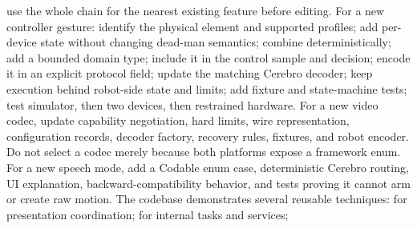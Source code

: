 {}
\markdownRendererSectionEnd \markdownRendererSectionBegin
{}\markdownRendererInterblockSeparator
{}\markdownRendererBlockQuoteBegin
{} use the whole chain for the nearest existing feature before editing.\markdownRendererBlockQuoteEnd \markdownRendererInterblockSeparator
{}For a new controller gesture:\markdownRendererInterblockSeparator
{}\markdownRendererOlBegin
{}identify the physical element and supported profiles;\markdownRendererOlItemEnd 
{}add per-device state without changing dead-man semantics;\markdownRendererOlItemEnd 
{}combine deterministically;\markdownRendererOlItemEnd 
{}add a bounded domain type;\markdownRendererOlItemEnd 
{}include it in the control sample and decision;\markdownRendererOlItemEnd 
{}encode it in an explicit protocol field;\markdownRendererOlItemEnd 
{}update the matching Cerebro decoder;\markdownRendererOlItemEnd 
{}keep execution behind robot-side state and limits;\markdownRendererOlItemEnd 
{}add fixture and state-machine tests;\markdownRendererOlItemEnd 
{}test simulator, then two devices, then restrained hardware.\markdownRendererOlItemEnd 
\markdownRendererOlEnd \markdownRendererInterblockSeparator
{}For a new video codec, update capability negotiation, hard limits, wire representation, configuration records, decoder factory, recovery rules, fixtures, and robot encoder. Do not select a codec merely because both platforms expose a framework enum.\markdownRendererParagraphSeparator
{}For a new speech mode, add a Codable enum case, deterministic Cerebro routing, UI explanation, backward-compatibility behavior, and tests proving it cannot arm or create raw motion.\markdownRendererInterblockSeparator
{}
\markdownRendererSectionEnd \markdownRendererSectionBegin
{}\markdownRendererInterblockSeparator
{}The codebase demonstrates several reusable techniques:\markdownRendererInterblockSeparator
{}\markdownRendererUlBegin
\markdownRendererUlItem {} for presentation coordination;\markdownRendererUlItemEnd 
\markdownRendererUlItem {} for internal tasks and services;\markdownRendererUlItemEnd 
